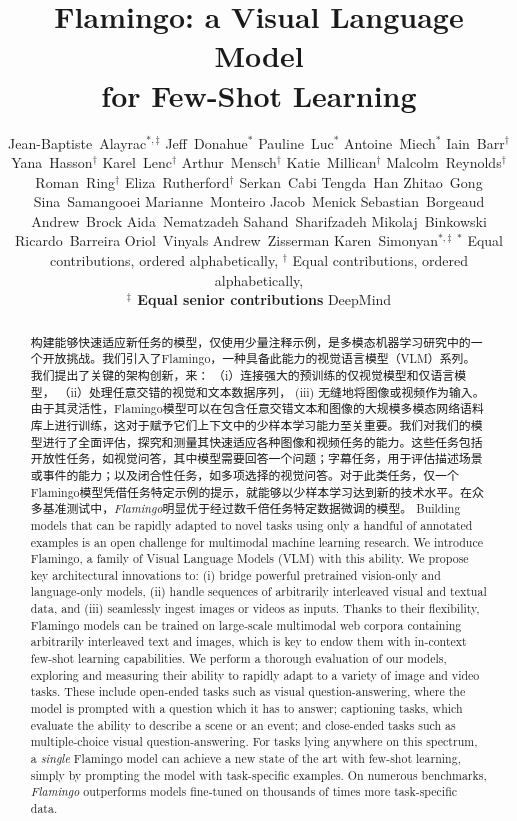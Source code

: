 \documentclass{article}
\title{\centering \flamingoemoji{} Flamingo: a Visual Language Model \\ for Few-Shot Learning
\vspace*{-0.3cm}
}
\author{
    Jean-Baptiste~Alayrac$^{*,\ddag}$ \And
    \And
    Jeff~Donahue$^{*}$ \And
    \And
    Pauline~Luc$^{*}$ \And
    \And
    Antoine~Miech$^{*}$ \And
    Iain~Barr$^{\dagger}$ \And
    Yana~Hasson$^{\dagger}$ \And
    Karel~Lenc$^{\dagger}$ \And
    Arthur~Mensch$^{\dagger}$ \And
    Katie~Millican$^{\dagger}$ \And
    Malcolm~Reynolds$^{\dagger}$ \And
    Roman~Ring$^{\dagger}$ \And
    Eliza~Rutherford$^{\dagger}$ \And
    Serkan~Cabi \And
    Tengda~Han \And
    Zhitao~Gong \And
    Sina~Samangooei \And
    Marianne~Monteiro \And
    Jacob~Menick \And
    Sebastian~Borgeaud \And
    Andrew~Brock \And
    Aida~Nematzadeh \And
    Sahand~Sharifzadeh \And
    Mikolaj~Binkowski \And
    Ricardo~Barreira \And
    Oriol~Vinyals \And
    Andrew~Zisserman \And
    Karen~Simonyan$^{*,\ddag}$ \And
    $^{*}$ \small{Equal contributions, ordered alphabetically, $^{\dagger}$ Equal contributions, ordered alphabetically,} \\
    \small{\textbf{$^{\ddag}$ Equal senior contributions}} \AND
    DeepMind
        }
\newcommand{\method}{Flamingo}
\newcommand{\largem}{\emph{\method{}}}
\begin{document}
\maketitle

\begin{abstract}
构建能够快速适应新任务的模型，仅使用少量注释示例，是多模态机器学习研究中的一个开放挑战。我们引入了\method{}，一种具备此能力的视觉语言模型（VLM）系列。我们提出了关键的架构创新，来： （i）连接强大的预训练的仅视觉模型和仅语言模型， （ii）处理任意交错的视觉和文本数据序列， (iii) 无缝地将图像或视频作为输入。 由于其灵活性，\method{}模型可以在包含任意交错文本和图像的大规模多模态网络语料库上进行训练，这对于赋予它们上下文中的少样本学习能力至关重要。我们对我们的模型进行了全面评估，探究和测量其快速适应各种图像和视频任务的能力。这些任务包括开放性任务，如视觉问答，其中模型需要回答一个问题；字幕任务，用于评估描述场景或事件的能力；以及闭合性任务，如多项选择的视觉问答。对于此类任务，仅一个\method{}模型凭借任务特定示例的提示，就能够以少样本学习达到新的技术水平。在众多基准测试中，\largem{}明显优于经过数千倍任务特定数据微调的模型。
Building models that can be rapidly adapted to novel tasks
using only a handful of annotated examples is an open challenge for multimodal machine learning research.
We introduce \method{}, a family of Visual Language Models (VLM) with this ability.
We propose key architectural innovations to:
(i) bridge powerful pretrained vision-only and language-only models,
(ii) handle sequences of arbitrarily interleaved visual and textual data,
and (iii) seamlessly ingest images or videos as inputs.
Thanks to their flexibility, \method{} models can be trained on large-scale multimodal web corpora containing arbitrarily interleaved text and images, which is key to endow them with in-context few-shot learning capabilities.
We perform a thorough evaluation of our models, exploring and measuring their ability to rapidly adapt to a variety of image and video tasks.
These include open-ended tasks such as visual question-answering, where the model is prompted with a question which it has to answer; captioning tasks, which evaluate the ability to describe a scene or an event;
and close-ended tasks such as multiple-choice visual question-answering.
For tasks lying anywhere on this spectrum, a \emph{single} \method{} model can achieve a new state of the art with few-shot learning, simply by prompting the model with task-specific examples.
On numerous benchmarks, \largem{} outperforms models fine-tuned on thousands of times more task-specific data.%
\end{abstract}
\end{document}
